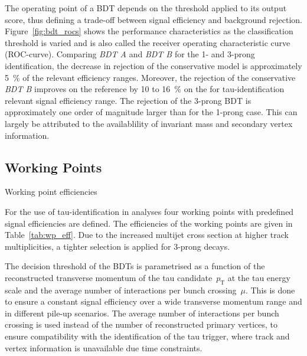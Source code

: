 The operating point of a BDT depends on the threshold applied to its output
score, thus defining a trade-off between signal efficiency and background
rejection. Figure~\ref{fig:bdt_rocs} shows the performance characteristics as
the classification threshold is varied and is also called the receiver operating
characteristic curve (ROC-curve). Comparing \emph{BDT A} and \emph{BDT B} for
the 1- and 3-prong identification, the decrease in rejection of the conservative
model is approximately \SI{5}{\percent} of the relevant efficiency ranges.
Moreover, the rejection of the conservative \emph{BDT B} improves on the
reference by \num{10} to \SI{16}{\percent} on the for tau-identification
relevant signal efficiency range. The rejection of the 3-prong BDT is
approximately one order of magnitude larger than for the 1-prong case. This can
largely be attributed to the availablility of invariant mass and secondary
vertex information.

\subsection{Working Points}
\label{sec:bdt_working_points}


\begin{table}[htb]
  \centering
  {\small}
  \caption{Working point efficiencies}
  \label{tab:wp_eff}
\end{table}

For the use of tau-identification in analyses four working points with
predefined signal efficiencies are defined. The efficiencies of the working
points are given in Table~\ref{tab:wp_eff}. Due to the increased multijet cross
section at higher track multiplicities, a tighter selection is applied for
3-prong decays.

The decision threshold of the BDTs is parametrised as a function of the
reconstructed transverse momentum of the tau candidate~$p_\text{T}$ at the tau
energy scale and the average number of interactions per bunch crossing~$\mu$.
This is done to ensure a constant signal efficiency over a wide transverse
momentum range and in different pile-up scenarios. The average number of
interactions per bunch crossing is used instead of the number of reconstructed
primary vertices, to ensure compatibility with the identification of the tau
trigger, where track and vertex information is unavailable due time constraints.

